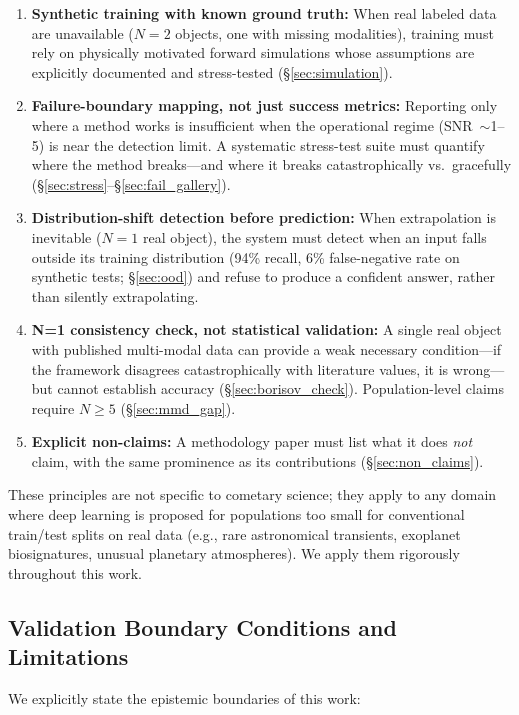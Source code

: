 \documentclass[usenatbib]{mnras}
\begin{document}
\begin{enumerate}
    \item \textbf{Synthetic training with known ground truth:} When real labeled data are unavailable ($N=2$ objects, one with missing modalities), training must rely on physically motivated forward simulations whose assumptions are explicitly documented and stress-tested (\S\ref{sec:simulation}).
    \item \textbf{Failure-boundary mapping, not just success metrics:} Reporting only where a method works is insufficient when the operational regime (SNR~$\sim$1--5) is near the detection limit. A systematic stress-test suite must quantify where the method breaks---and where it breaks catastrophically vs.\ gracefully (\S\ref{sec:stress}--\S\ref{sec:fail_gallery}).
    \item \textbf{Distribution-shift detection before prediction:} When extrapolation is inevitable ($N=1$ real object), the system must detect when an input falls outside its training distribution (94\% recall, 6\% false-negative rate on synthetic tests; \S\ref{sec:ood}) and refuse to produce a confident answer, rather than silently extrapolating.
    \item \textbf{N=1 consistency check, not statistical validation:} A single real object with published multi-modal data can provide a weak necessary condition---if the framework disagrees catastrophically with literature values, it is wrong---but cannot establish accuracy (\S\ref{sec:borisov_check}). Population-level claims require $N \geq 5$ (\S\ref{sec:mmd_gap}).
    \item \textbf{Explicit non-claims:} A methodology paper must list what it does \textit{not} claim, with the same prominence as its contributions (\S\ref{sec:non_claims}).
\end{enumerate}

These principles are not specific to cometary science; they apply to any domain where deep learning is proposed for populations too small for conventional train/test splits on real data (e.g., rare astronomical transients, exoplanet biosignatures, unusual planetary atmospheres). We apply them rigorously throughout this work.

\subsection{Validation Boundary Conditions and Limitations}\label{sec:boundaries}

We explicitly state the epistemic boundaries of this work:
\end{document}
